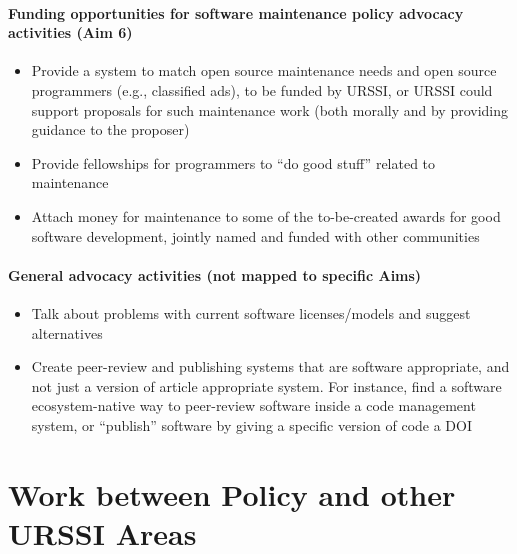 \documentclass[
]{book}
\begin{document}
\hypertarget{funding-opportunities-for-software-maintenance-policy-advocacy-activities-aim-6}{%
\paragraph{Funding opportunities for software maintenance policy advocacy activities (Aim 6)}\label{funding-opportunities-for-software-maintenance-policy-advocacy-activities-aim-6}}

\begin{itemize}
\item
  Provide a system to match open source maintenance needs and open source programmers
  (e.g., classified ads), to be funded by URSSI, or URSSI could support proposals for such
  maintenance work (both morally and by providing guidance to the proposer)
\item
  Provide fellowships for programmers to ``do good stuff'' related to maintenance
\item
  Attach money for maintenance to some of the to-be-created awards for good software
  development, jointly named and funded with other communities
\end{itemize}

\hypertarget{general-advocacy-activities-not-mapped-to-specific-aims-1}{%
\paragraph{General advocacy activities (not mapped to specific Aims)}\label{general-advocacy-activities-not-mapped-to-specific-aims-1}}

\begin{itemize}
\item
  Talk about problems with current software licenses/models and suggest alternatives
\item
  Create peer-review and publishing systems that are software appropriate, and not just a version of
  article appropriate system. For instance, find a software ecosystem-native way to peer-review software
  inside a code management system, or ``publish'' software by giving a specific version of code a DOI
\end{itemize}

\hypertarget{work-between-policy-and-other-urssi-areas}{%
\section{Work between Policy and other URSSI Areas}\label{work-between-policy-and-other-urssi-areas}}
\end{document}
